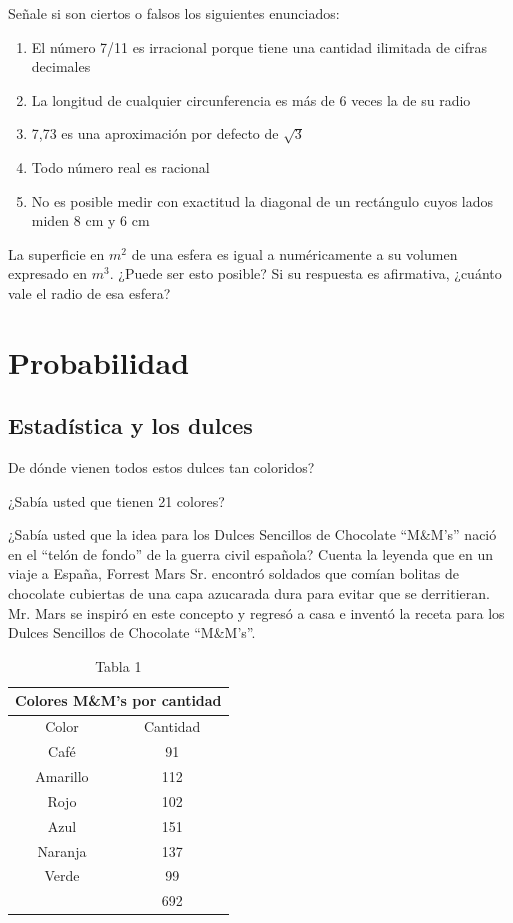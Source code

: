 \documentclass[letterpaper,10pt,twoside]{article}
\begin{document}
\begin{enumerate}
\begin{multicols}{2}
    \item Señale si son ciertos o falsos los siguientes enunciados:
    \begin{enumerate}
      \item El número 7/11 es irracional porque tiene una cantidad ilimitada de cifras decimales
      \item La longitud de cualquier circunferencia es más de 6 veces la de su radio
      \item 7,73 es una aproximación por defecto de $ \sqrt{3} $
      \item Todo número real es racional
      \item No es posible medir con exactitud la diagonal de un rectángulo cuyos lados miden 8 cm y 6 cm
    \end{enumerate}
    \item La superficie en $ m^2 $ de una esfera es igual a numéricamente a su volumen expresado en $ m^3 $. ¿Puede ser esto posible? Si su respuesta es afirmativa, ¿cuánto vale el radio de esa esfera?
  \end{multicols}
  \end{enumerate}
 \section{Probabilidad}
 \subsection*{Estad\'istica y los dulces}
De dónde vienen todos estos dulces tan coloridos?

¿Sabía usted que tienen 21 colores?

¿Sabía usted que la idea para los Dulces Sencillos de Chocolate “M\&M’s” nació
en el “telón de fondo” de la guerra civil española? Cuenta la leyenda que en un
viaje a España, Forrest Mars Sr. encontró soldados que comían bolitas de chocolate
cubiertas de una capa azucarada dura para evitar que se derritieran. Mr. Mars se
inspiró en este concepto y regresó a casa e inventó la receta para los Dulces Sencillos de Chocolate “M\&M’s”.
\begin{table}[h!]
\centering
\begin{tabular}{cc}
\multicolumn{2}{c}{Colores M\&M's por cantidad} \\ \hline
Color & Cantidad \\ \hline
Café & 91 \\ 
Amarillo & 112 \\ 
Rojo & 102 \\ 
Azul & 151 \\ 
Naranja & 137 \\ 
Verde & 99 \\ \cline{2-2}
 & 692 \\ 
\hline
\end{tabular}
\caption{Tabla 1} \label{tab1}
\end{table}
\end{document}
